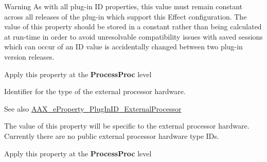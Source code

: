 \begin{Desc}
\begin{description}
\begin{DoxyWarning}{Warning}
As with all plug-\/in I\+D properties, this value must remain constant across all releases of the plug-\/in which support this Effect configuration. The value of this property should be stored in a constant rather than being calculated at run-\/time in order to avoid unresolvable compatibility issues with saved sessions which can occur of an I\+D value is accidentally changed between two plug-\/in version releases.
\end{DoxyWarning}
\begin{DoxyItemize}
\item Apply this property at the {\bfseries Process\+Proc} level \end{DoxyItemize}
\item[{\em 
\hypertarget{a00283_a6571f4e41a5dd06e4067249228e2249eae51207358c4c8a00e6c5e26650ebeef2}{}A\+A\+X\+\_\+e\+Property\+\_\+\+External\+Processor\+Type\+I\+D\label{a00283_a6571f4e41a5dd06e4067249228e2249eae51207358c4c8a00e6c5e26650ebeef2}
}]Identifier for the type of the external processor hardware. \begin{DoxySeeAlso}{See also}
\hyperlink{a00283_a6571f4e41a5dd06e4067249228e2249ea2816852168f862575c687d28b48d0581}{A\+A\+X\+\_\+e\+Property\+\_\+\+Plug\+In\+I\+D\+\_\+\+External\+Processor}
\end{DoxySeeAlso}
The value of this property will be specific to the external processor hardware. Currently there are no public external processor hardware type I\+Ds.

\begin{DoxyItemize}
\item Apply this property at the {\bfseries Process\+Proc} level \end{DoxyItemize}
\item[{\em 
\hypertarget{a00283_a6571f4e41a5dd06e4067249228e2249ea9a78445174f219014332c67af3b1eda6}{}A\+A\+X\+\_\+e\+Property\+\_\+\+Process\+Proc\+Props\+Base\label{a00283_a6571f4e41a5dd06e4067249228e2249ea9a78445174f219014332c67af3b1eda6}
}]


\end{description}
\end{Desc}
